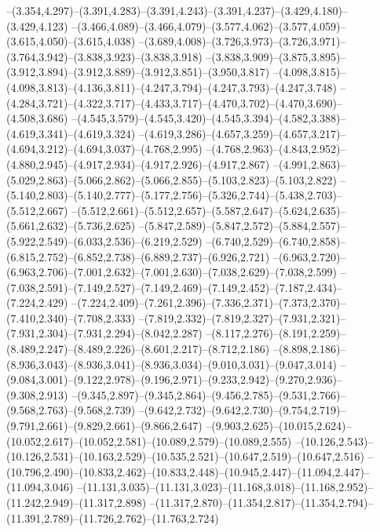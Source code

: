   --(3.354,4.297)--(3.391,4.283)--(3.391,4.243)--(3.391,4.237)--(3.429,4.180)--(3.429,4.123)%
  --(3.466,4.089)--(3.466,4.079)--(3.577,4.062)--(3.577,4.059)--(3.615,4.050)--(3.615,4.038)%
  --(3.689,4.008)--(3.726,3.973)--(3.726,3.971)--(3.764,3.942)--(3.838,3.923)--(3.838,3.918)%
  --(3.838,3.909)--(3.875,3.895)--(3.912,3.894)--(3.912,3.889)--(3.912,3.851)--(3.950,3.817)%
  --(4.098,3.815)--(4.098,3.813)--(4.136,3.811)--(4.247,3.794)--(4.247,3.793)--(4.247,3.748)%
  --(4.284,3.721)--(4.322,3.717)--(4.433,3.717)--(4.470,3.702)--(4.470,3.690)--(4.508,3.686)%
  --(4.545,3.579)--(4.545,3.420)--(4.545,3.394)--(4.582,3.388)--(4.619,3.341)--(4.619,3.324)%
  --(4.619,3.286)--(4.657,3.259)--(4.657,3.217)--(4.694,3.212)--(4.694,3.037)--(4.768,2.995)%
  --(4.768,2.963)--(4.843,2.952)--(4.880,2.945)--(4.917,2.934)--(4.917,2.926)--(4.917,2.867)%
  --(4.991,2.863)--(5.029,2.863)--(5.066,2.862)--(5.066,2.855)--(5.103,2.823)--(5.103,2.822)%
  --(5.140,2.803)--(5.140,2.777)--(5.177,2.756)--(5.326,2.744)--(5.438,2.703)--(5.512,2.667)%
  --(5.512,2.661)--(5.512,2.657)--(5.587,2.647)--(5.624,2.635)--(5.661,2.632)--(5.736,2.625)%
  --(5.847,2.589)--(5.847,2.572)--(5.884,2.557)--(5.922,2.549)--(6.033,2.536)--(6.219,2.529)%
  --(6.740,2.529)--(6.740,2.858)--(6.815,2.752)--(6.852,2.738)--(6.889,2.737)--(6.926,2.721)%
  --(6.963,2.720)--(6.963,2.706)--(7.001,2.632)--(7.001,2.630)--(7.038,2.629)--(7.038,2.599)%
  --(7.038,2.591)--(7.149,2.527)--(7.149,2.469)--(7.149,2.452)--(7.187,2.434)--(7.224,2.429)%
  --(7.224,2.409)--(7.261,2.396)--(7.336,2.371)--(7.373,2.370)--(7.410,2.340)--(7.708,2.333)%
  --(7.819,2.332)--(7.819,2.327)--(7.931,2.321)--(7.931,2.304)--(7.931,2.294)--(8.042,2.287)%
  --(8.117,2.276)--(8.191,2.259)--(8.489,2.247)--(8.489,2.226)--(8.601,2.217)--(8.712,2.186)%
  --(8.898,2.186)--(8.936,3.043)--(8.936,3.041)--(8.936,3.034)--(9.010,3.031)--(9.047,3.014)%
  --(9.084,3.001)--(9.122,2.978)--(9.196,2.971)--(9.233,2.942)--(9.270,2.936)--(9.308,2.913)%
  --(9.345,2.897)--(9.345,2.864)--(9.456,2.785)--(9.531,2.766)--(9.568,2.763)--(9.568,2.739)%
  --(9.642,2.732)--(9.642,2.730)--(9.754,2.719)--(9.791,2.661)--(9.829,2.661)--(9.866,2.647)%
  --(9.903,2.625)--(10.015,2.624)--(10.052,2.617)--(10.052,2.581)--(10.089,2.579)--(10.089,2.555)%
  --(10.126,2.543)--(10.126,2.531)--(10.163,2.529)--(10.535,2.521)--(10.647,2.519)--(10.647,2.516)%
  --(10.796,2.490)--(10.833,2.462)--(10.833,2.448)--(10.945,2.447)--(11.094,2.447)--(11.094,3.046)%
  --(11.131,3.035)--(11.131,3.023)--(11.168,3.018)--(11.168,2.952)--(11.242,2.949)--(11.317,2.898)%
  --(11.317,2.870)--(11.354,2.817)--(11.354,2.794)--(11.391,2.789)--(11.726,2.762)--(11.763,2.724)%
